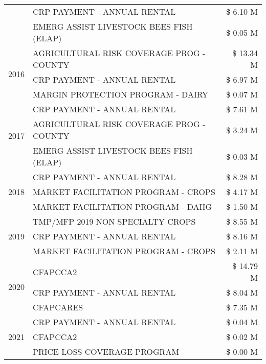 \begin{tabular}{llr}
 & CRP PAYMENT - ANNUAL RENTAL & \$ 6.10 M \\
 & EMERG ASSIST LIVESTOCK BEES FISH (ELAP) & \$ 0.05 M \\
\cline{1-3}
\multirow[t]{3}{*}{2016} & AGRICULTURAL RISK COVERAGE PROG - COUNTY & \$ 13.34 M \\
 & CRP PAYMENT - ANNUAL RENTAL & \$ 6.97 M \\
 & MARGIN PROTECTION PROGRAM - DAIRY & \$ 0.07 M \\
\cline{1-3}
\multirow[t]{3}{*}{2017} & CRP PAYMENT - ANNUAL RENTAL & \$ 7.61 M \\
 & AGRICULTURAL RISK COVERAGE PROG - COUNTY & \$ 3.24 M \\
 & EMERG ASSIST LIVESTOCK BEES FISH (ELAP) & \$ 0.03 M \\
\cline{1-3}
\multirow[t]{3}{*}{2018} & CRP PAYMENT - ANNUAL RENTAL & \$ 8.28 M \\
 & MARKET FACILITATION PROGRAM - CROPS & \$ 4.17 M \\
 & MARKET FACILITATION PROGRAM - DAHG & \$ 1.50 M \\
\cline{1-3}
\multirow[t]{3}{*}{2019} & TMP/MFP 2019 NON SPECIALTY CROPS & \$ 8.55 M \\
 & CRP PAYMENT - ANNUAL RENTAL & \$ 8.16 M \\
 & MARKET FACILITATION PROGRAM - CROPS & \$ 2.11 M \\
\cline{1-3}
\multirow[t]{3}{*}{2020} & CFAPCCA2 & \$ 14.79 M \\
 & CRP PAYMENT - ANNUAL RENTAL & \$ 8.04 M \\
 & CFAPCARES & \$ 7.35 M \\
\cline{1-3}
\multirow[t]{3}{*}{2021} & CRP PAYMENT - ANNUAL RENTAL & \$ 0.04 M \\
 & CFAPCCA2 & \$ 0.02 M \\
 & PRICE LOSS COVERAGE PROGRAM & \$ 0.00 M \\
\cline{1-3}
\bottomrule
\end{tabular}
